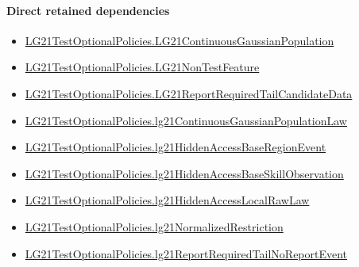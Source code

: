 \documentclass[10pt]{article}
\begin{document}
\paragraph{Direct retained dependencies}
\begin{itemize}\raggedright
\item \hyperlink{paper-prerequisite-f5e1c886d250142b}{LG21\allowbreak{}Test\allowbreak{}Optional\allowbreak{}Policies.\allowbreak{}LG21\allowbreak{}Continuous\allowbreak{}Gaussian\allowbreak{}Population}
\item \hyperlink{governing-declaration-81cb73bf3869c56d}{LG21\allowbreak{}Test\allowbreak{}Optional\allowbreak{}Policies.\allowbreak{}LG21\allowbreak{}Non\allowbreak{}Test\allowbreak{}Feature}
\item \hyperlink{governing-declaration-86a64a1aa812778e}{LG21\allowbreak{}Test\allowbreak{}Optional\allowbreak{}Policies.\allowbreak{}LG21\allowbreak{}Report\allowbreak{}Required\allowbreak{}Tail\allowbreak{}Candidate\allowbreak{}Data}
\item \hyperlink{governing-declaration-8fd8cc4e09eeb58a}{LG21\allowbreak{}Test\allowbreak{}Optional\allowbreak{}Policies.\allowbreak{}lg21\allowbreak{}Continuous\allowbreak{}Gaussian\allowbreak{}Population\allowbreak{}Law}
\item \hyperlink{governing-declaration-cecb402908ae7bf6}{LG21\allowbreak{}Test\allowbreak{}Optional\allowbreak{}Policies.\allowbreak{}lg21\allowbreak{}Hidden\allowbreak{}Access\allowbreak{}Base\allowbreak{}Region\allowbreak{}Event}
\item \hyperlink{governing-declaration-88596ee39a94dded}{LG21\allowbreak{}Test\allowbreak{}Optional\allowbreak{}Policies.\allowbreak{}lg21\allowbreak{}Hidden\allowbreak{}Access\allowbreak{}Base\allowbreak{}Skill\allowbreak{}Observation}
\item \hyperlink{governing-declaration-021e105247bd247f}{LG21\allowbreak{}Test\allowbreak{}Optional\allowbreak{}Policies.\allowbreak{}lg21\allowbreak{}Hidden\allowbreak{}Access\allowbreak{}Local\allowbreak{}Raw\allowbreak{}Law}
\item \hyperlink{governing-declaration-ee825e256b6d452b}{LG21\allowbreak{}Test\allowbreak{}Optional\allowbreak{}Policies.\allowbreak{}lg21\allowbreak{}Normalized\allowbreak{}Restriction}
\item \hyperlink{governing-declaration-fd670aa71fd6194e}{LG21\allowbreak{}Test\allowbreak{}Optional\allowbreak{}Policies.\allowbreak{}lg21\allowbreak{}Report\allowbreak{}Required\allowbreak{}Tail\allowbreak{}No\allowbreak{}Report\allowbreak{}Event}
\end{itemize}
\hypertarget{governing-declaration-7168d35e0f623750}{}
\end{document}
